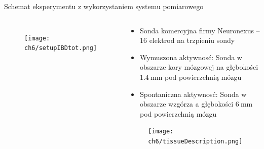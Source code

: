 \begin{frame}{Schemat eksperymentu z wykorzystaniem systemu pomiarowego}
    \begin{columns}



        \begin{figure}[H]
            \centering 
            \texttt{[image: ch6/setupIBDtot.png]}  
        \end{figure}

        \vspace{-1em}

        \begin{block}{}

            \begin{itemize}
                \item Sonda komercyjna firmy Neuronexus -- 16 elektrod na trzpieniu sondy
                \item Wymuszona aktywnosć: Sonda w obszarze kory mózgowej na głębokości $\SI{1.4}{\milli\metre}$ pod powierzchnią mózgu
                \item Spontaniczna aktywnosć: Sonda w obszarze wzgórza a głębokości $\SI{6}{\milli\metre}$ pod powierzchnią mózgu


            \end{itemize}
            \vspace{-1em}

            \begin{figure}[H]
                \centering 
                \texttt{[image: ch6/tissueDescription.png]}  
            \end{figure}
        \end{block}



    \end{columns}

\end{frame}

   
   

